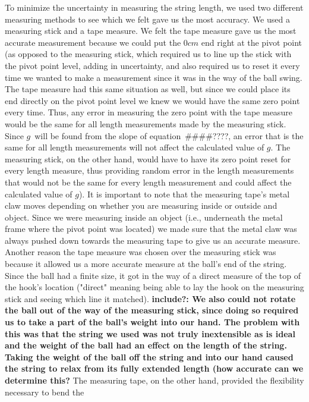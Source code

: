 \documentclass[iop,numberedappendix,appendixfloats]{emulateapj}
\def\g{$g$}
\def\fillin{\#\#\#\#????}
\begin{document}
To minimize the uncertainty in measuring the string length, we used two 
different measuring methods to see which we felt gave us the most accuracy. 
We used a measuring stick and a tape measure.  We felt the tape measure gave 
us the most accurate measurement because we could put the $0cm$ end right at 
the pivot point (as opposed to the measuring stick, which required us to line 
up the stick with the pivot point level, adding in uncertainty, and also 
required us to reset it every time we wanted to make a measurement since it 
was in the way of the ball swing. The tape measure had this same situation 
as well, but since we could place its end directly on the pivot point level 
we knew we would have the same zero point every time. Thus, any error in 
measuring the zero point with the tape measure would be the same for all 
length measurements made by the measuring stick.  Since \g\ will be found 
from the slope of equation~\fillin, an error that is the same for all length 
measurements will not affect the calculated value of \g.  The measuring stick, 
on the other hand, would have to have its zero point reset for every length 
measure, thus providing random error in the length measurements that would 
not be the same for every length measurement and could affect the calculated 
value of \g).  It is important to note that the measuring tape's metal claw 
moves depending on whether you are measuring inside or outside and object. 
Since we were measuring inside an object (i.e., underneath the metal frame 
where the pivot point was located) we made sure that the metal claw was always 
pushed down towards the measuring tape to give us an accurate measure.  
Another reason the tape measure was chosen over the measuring stick was 
because it allowed us a more accurate measure at the ball's end of the string. 
Since the ball had a finite size, it got in the way of a direct measure of the 
top of the hook's location ("direct" meaning being able to lay the hook on the 
measuring stick and seeing which line it matched). {\bf include?:  We also could not rotate 
the ball out of the way of the measuring stick, since doing so required us to 
take a part of the ball's weight into our hand.  The problem with this was 
that the string we used was not truly inextensible as is ideal and the weight 
of the ball had an effect on the length of the string.  Taking the weight of 
the ball off the string and into our hand caused the string to relax from its 
fully extended length (how accurate can we determine this?}  The measuring 
tape, on the other hand, provided the flexibility necessary to bend the 
\end{document}
